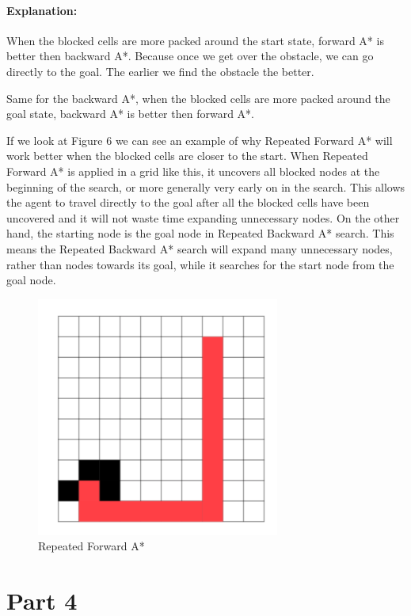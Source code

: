 \documentclass[11pt]{report}
\begin{document}
\paragraph{Explanation:}

When the blocked cells are more packed around the start state, forward A* is better then backward A*. Because once we get over the obstacle, we can go directly to the goal. The earlier we find the obstacle the better.

Same for the backward A*, when the blocked cells are more packed around the goal state, backward A* is better then forward A*. 

If we look at Figure 6 we can see an example of why Repeated Forward A* will work better when the blocked cells are closer to the start. When Repeated Forward A* is applied in a grid like this, it uncovers all blocked nodes at the beginning of the search, or more generally very early on in the search. This allows the agent to travel directly to the goal after all the blocked cells have been uncovered and it will not waste time expanding unnecessary nodes. On the other hand, the starting node is the goal node in Repeated Backward A* search. This means the Repeated Backward A* search will expand many unnecessary nodes, rather than nodes towards its goal, while it searches for the start node from the goal node.


\begin{figure}[h]
\begin{center}
\includegraphics[scale=0.5]{Part3_2.png} 
\end{center}
\caption{Repeated Forward A*}
\end{figure}

\newpage

\section*{Part 4}
\end{document}
